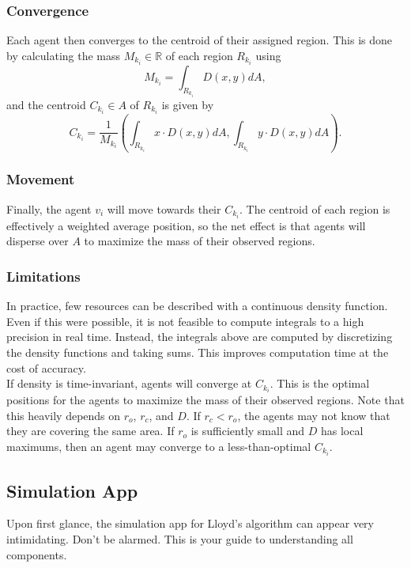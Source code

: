 \documentclass[../CourseManual.tex]{subfiles}
\begin{document}
\subsubsection{Convergence} \label{Lloyd Convergence}
Each agent then converges to the centroid of their assigned region. This is done by calculating the mass $M_{k_i} \in \mathbb{R}$ of each region $R_{k_i}$ using
\[M_{k_i} =\int_{R_{k_i}}D(x, y)dA,\]
and the centroid $C_{k_i} \in A$ of $R_{k_i}$ is given by
\[C_{k_i} =\frac{1}{M_{k_i}}\left(\int_{R_{k_i}} x \cdot D(x, y)dA, \int_{R_{k_i}} y \cdot D(x, y) dA\right).\]

\subsubsection{Movement} \label{Lloyd Movement}
Finally, the agent $v_i$ will move towards their $C_{k_i}$. The centroid of each region is effectively a weighted average position, so the net effect is that agents will disperse over $A$ to maximize the mass of their observed regions.

\subsubsection{Limitations} \label{Lloyd Limitations}
In practice, few resources can be described with a continuous density function. Even if this were possible, it is not feasible to compute integrals to a high precision in real time. Instead, the integrals above are computed by discretizing the density functions and taking sums. This improves computation time at the cost of accuracy. \\

If density is time-invariant, agents will converge at $C_{k_i}$. This is the optimal positions for the agents to maximize the mass of their observed regions. Note that this heavily depends on $r_o$, $r_c$, and $D$. If $r_c < r_o$, the agents may not know that they are covering the same area. If $r_o$ is sufficiently small and $D$ has local maximums, then an agent may converge to a less-than-optimal $C_{k_i}$. \\



\subsection{Simulation App} \label{Simulation App: Lloyd}
Upon first glance, the simulation app for Lloyd's algorithm can appear very intimidating. Don't be alarmed. This is your guide to understanding all components. 
\end{document}
